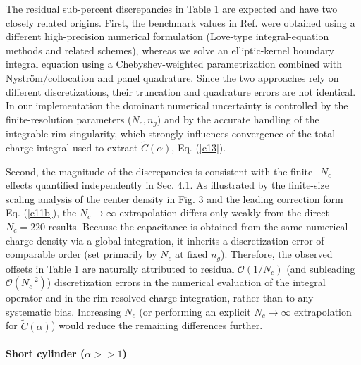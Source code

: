 \documentclass[12pt]{article}
\begin{document}
The residual sub-percent discrepancies in Table 1 are expected and have two
closely related origins. First, the benchmark values in Ref.\cite{exp3} were
obtained using a different high-precision numerical formulation (Love-type
integral-equation methods and related schemes), whereas we solve an
elliptic-kernel boundary integral equation using a Chebyshev-weighted
parametrization combined with Nystr\"{o}m/collocation and panel quadrature.
Since the two approaches rely on different discretizations, their truncation
and quadrature errors are not identical. In our implementation the dominant
numerical uncertainty is controlled by the finite-resolution parameters
($N_{c},n_{g}$) and by the accurate handling of the integrable rim
singularity, which strongly influences convergence of the total-charge
integral used to extract $\widetilde{C}(\alpha)$, Eq. (\ref{c13}).

Second, the magnitude of the discrepancies is consistent with the
finite$-N_{c}$ effects quantified independently in Sec. 4.1. As illustrated by
the finite-size scaling analysis of the center density in Fig. 3 and the
leading correction form Eq. (\ref{c11b}), the $N_{c}\rightarrow\infty$
extrapolation differs only weakly from the direct $N_{c}=220$ results. Because
the capacitance is obtained from the same numerical charge density via a
global integration, it inherits a discretization error of comparable order
(set primarily by $N_{c}$ at fixed $n_{g}$). Therefore, the observed offsets
in Table 1 are naturally attributed to residual $\mathcal{O}(1/N_{c}) $ (and
subleading $\mathcal{O}(N_{c}^{-2})$) discretization errors in the numerical
evaluation of the integral operator and in the rim-resolved charge
integration, rather than to any systematic bias. Increasing $N_{c}$ (or
performing an explicit $N_{c}\rightarrow\infty$ extrapolation for
$\widetilde{C}(\alpha)$) would reduce the remaining differences further.

\paragraph{Short cylinder ($\alpha>>1$)}
\end{document}
